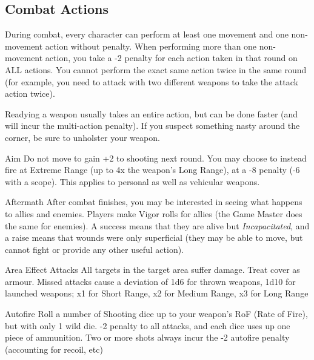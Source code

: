 \subsection{Combat Actions}
\label{sec:rules-combat}

During combat, every character can perform at least one movement and one non-movement action without penalty. When performing more than one non-movement action, you take a -2 penalty for each action taken in that round on ALL actions. You cannot perform the exact same action twice in the same round (for example, you need to attack with two different weapons to take the attack action twice).

Readying a weapon usually takes an entire action, but can be done faster (and will incur the multi-action penalty). If you suspect something nasty around the corner, be sure to unholster your weapon.

\begin{genericsection}{Aim}
Do not move to gain +2 to shooting next round. You may choose to instead fire at Extreme Range (up to 4x the weapon’s Long Range), at a -8 penalty (-6 with a scope). This applies to personal as well as vehicular weapons.
\end{genericsection}

\begin{genericsection}{Aftermath}
After combat finishes, you may be interested in seeing what happens to allies and enemies. Players make Vigor rolls for allies (the Game Master does the same for enemies). A success means that they are alive but \textit{Incapacitated}, and a raise means that wounds were only superficial (they may be able to move, but cannot fight or provide any other useful action).
\end{genericsection}

\begin{genericsection}{Area Effect Attacks}
All targets in the target area suffer damage. Treat cover as armour. Missed attacks cause a deviation of 1d6 for thrown weapons, 1d10 for launched weapons; x1 for Short Range, x2 for Medium Range, x3 for Long Range
\end{genericsection}

\begin{genericsection}{Autofire}
Roll a number of Shooting dice up to your weapon's RoF (Rate of Fire), but with only 1 wild die. -2 penalty to all attacks, and each dice uses up one piece of ammunition. Two or more shots always incur the -2 autofire penalty (accounting for recoil, etc)
\end{genericsection}

